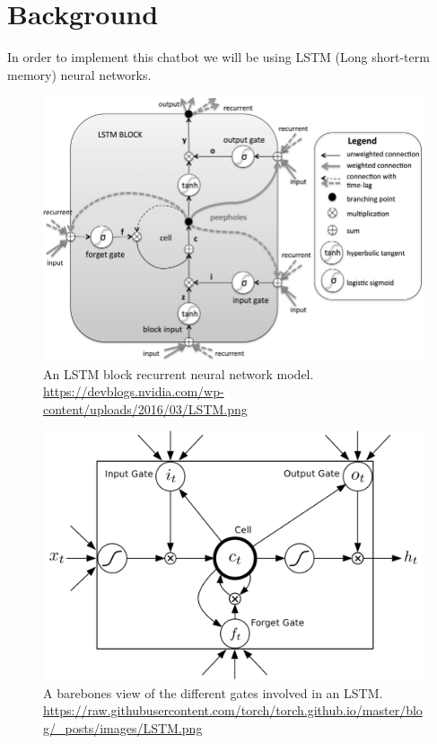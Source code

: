 \documentclass[titlepage]{article}
\begin{document}
\section{Background}
In order to implement this chatbot we will be using LSTM (Long short-term memory) neural networks.
\begin{figure}[H]
	\centering
	\captionsetup{justification=centering}
	\includegraphics[width=120mm]{images/LSTM-model.png}
	\caption{An LSTM block recurrent neural network model. \\{\tiny \url{https://devblogs.nvidia.com/wp-content/uploads/2016/03/LSTM.png}}}
	\label{fig:lstm1}
\end{figure}
\begin{figure}[H]
	\centering
	\captionsetup{justification=centering}
	\includegraphics[width=120mm]{images/LSTM-model-2.png}
	\caption{A barebones view of the different gates involved in an LSTM.\\{\tiny \url{https://raw.githubusercontent.com/torch/torch.github.io/master/blog/\_posts/images/LSTM.png}}}
	\label{fig:lstm2}
\end{figure}
\end{document}
